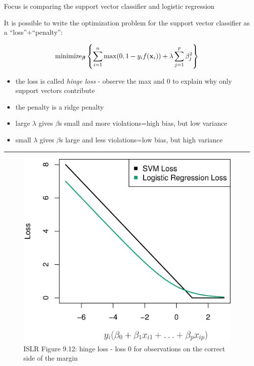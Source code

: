 \documentclass[]{article}
\begin{document}
Focus is comparing the support vector classifier and logistic regression

It is possible to write the optimization problem for the support vector
classifier as a ``loss''+``penalty'':

\[\text{minimize}_{\boldsymbol \beta} \left\{ \sum_{i=1}^n \max(0,1-y_i f({\bf x}_i))+ \lambda \sum_{j=1}^p \beta_j^2 \right\}\]

\begin{itemize}
\item
  the loss is called \emph{hinge loss} - observe the max and 0 to
  explain why only support vectors contribute
\item
  the penalty is a ridge penalty
\item
  large \(\lambda\) gives \(\beta\)s small and more violations=high
  bias, but low variance
\item
  small \(\lambda\) gives \(\beta\)s large and less violations=low bias,
  but high variance
\end{itemize}

\begin{center}\rule{0.5\linewidth}{\linethickness}\end{center}

\begin{figure}
\centering
\includegraphics{../ISLR/Chapter9/9.12.png}
\caption{ISLR Figure 9.12: hinge loss - loss 0 for observations on the
correct side of the margin}
\end{figure}
\end{document}
